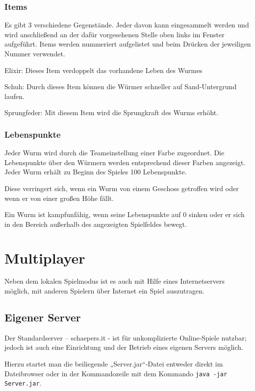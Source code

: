 \documentclass{scrreprt}
\begin{document}
\subsection{Items}

Es gibt 3 verschiedene Gegenstände. Jeder davon kann eingesammelt werden und wird anschließend an der dafür vorgesehenen Stelle oben links im Fenster aufgeführt.
Items werden nummeriert aufgelistet und beim Drücken der jeweiligen Nummer verwendet. 

Elixir: Dieses Item verdoppelt das vorhandene Leben des Wurmes

Schuh: Durch dieses Item können die Würmer schneller auf Sand-Untergrund laufen.

Sprungfeder: Mit diesem Item wird die Sprungkraft des Wurms erhöht.

\subsection{Lebenspunkte}

Jeder Wurm wird durch die Teameinstellung einer Farbe zugeordnet. Die Lebenspunkte über den Würmern werden entsprechend dieser Farben angezeigt.
Jeder Wurm erhält zu Beginn des Spieles 100 Lebenspunkte.

Diese verringert sich, wenn ein Wurm von einem Geschoss getroffen wird oder wenn er von einer großen Höhe fällt.

Ein Wurm ist kampfunfähig, wenn seine Lebenspunkte auf 0 sinken oder er sich in den Bereich außerhalb des angezeigten Spielfeldes bewegt.

\chapter{Multiplayer}

Neben dem lokalen Spielmodus ist es auch mit Hilfe eines Internetservers möglich, mit anderen Spielern über Internet ein Spiel auszutragen.

\section{Eigener Server}

Der Standardserver – schaepers.it - ist für unkomplizierte Online-Spiele nutzbar; jedoch ist auch eine Einrichtung und der Betrieb eines eigenen Servers möglich.

Hierzu startet man die beiliegende „Server.jar“-Datei entweder direkt im Dateibrowser oder in der Kommandozeile mit dem Kommando
\texttt{java -jar Server.jar}.
\end{document}
